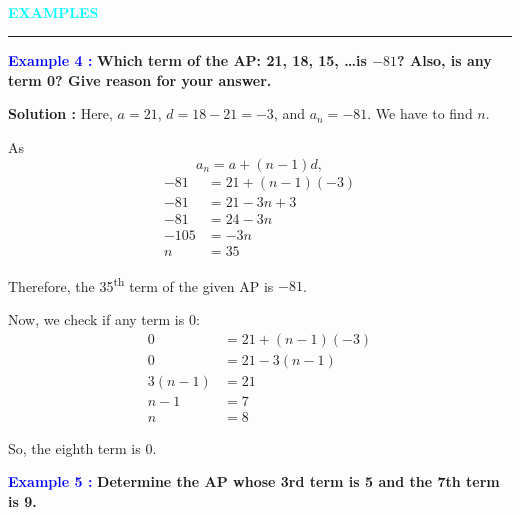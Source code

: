 \documentclass[a4paper,12pt]{article}
\begin{document}
\pagestyle{empty} %

\thispagestyle{fancy} %
\fancyhf{} %
\renewcommand{\headrulewidth}{0pt} %



\begin{center}
	{\LARGE \textbf{\textcolor{cyan}{\\  EXAMPLES }}}
\end{center}
\vspace{-1cm}
\noindent\rule{\textwidth}{0.5pt}



\textcolor{blue}{\textbf{Example 4 :}} \textbf{Which term of the AP: 21, 18, 15, \dots is $-81$? Also, is any term 0? Give reason for your answer.}

\textbf{Solution :} Here, $a = 21$, $d = 18 - 21 = -3$, and $a_n = -81$. We have to find $n$.

As
\[
a_n = a + (n - 1)d,
\]
\begin{align*}
-81 &= 21 + (n - 1)(-3) \\
-81 &= 21 - 3n + 3 \\
-81 &= 24 - 3n \\
-105 &= -3n \\
n &= 35
\end{align*}

Therefore, the 35\textsuperscript{th} term of the given AP is $-81$.

Now, we check if any term is 0:
\begin{align*}
0 &= 21 + (n - 1)(-3) \\
0 &= 21 - 3(n - 1) \\
3(n - 1) &= 21 \\
n - 1 &= 7 \\
n &= 8
\end{align*}

So, the eighth term is 0.

\textcolor{blue}{\textbf{Example 5 :}} \textbf{Determine the AP whose 3rd term is 5 and the 7th term is 9.}
\end{document}
